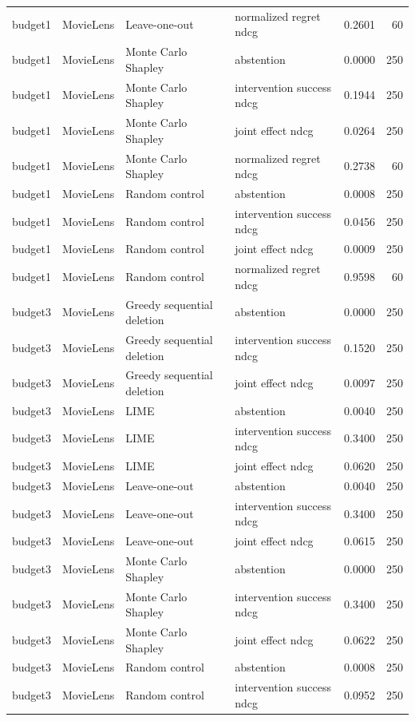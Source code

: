 \begin{longtable}{@{}p{}p{}p{}p{}rr@{}}
budget1 & MovieLens & Leave-one-out & normalized regret ndcg & 0.2601 & 60 \\
budget1 & MovieLens & Monte Carlo Shapley & abstention & 0.0000 & 250 \\
budget1 & MovieLens & Monte Carlo Shapley & intervention success ndcg & 0.1944 & 250 \\
budget1 & MovieLens & Monte Carlo Shapley & joint effect ndcg & 0.0264 & 250 \\
budget1 & MovieLens & Monte Carlo Shapley & normalized regret ndcg & 0.2738 & 60 \\
budget1 & MovieLens & Random control & abstention & 0.0008 & 250 \\
budget1 & MovieLens & Random control & intervention success ndcg & 0.0456 & 250 \\
budget1 & MovieLens & Random control & joint effect ndcg & 0.0009 & 250 \\
budget1 & MovieLens & Random control & normalized regret ndcg & 0.9598 & 60 \\
budget3 & MovieLens & Greedy sequential deletion & abstention & 0.0000 & 250 \\
budget3 & MovieLens & Greedy sequential deletion & intervention success ndcg & 0.1520 & 250 \\
budget3 & MovieLens & Greedy sequential deletion & joint effect ndcg & 0.0097 & 250 \\
budget3 & MovieLens & LIME & abstention & 0.0040 & 250 \\
budget3 & MovieLens & LIME & intervention success ndcg & 0.3400 & 250 \\
budget3 & MovieLens & LIME & joint effect ndcg & 0.0620 & 250 \\
budget3 & MovieLens & Leave-one-out & abstention & 0.0040 & 250 \\
budget3 & MovieLens & Leave-one-out & intervention success ndcg & 0.3400 & 250 \\
budget3 & MovieLens & Leave-one-out & joint effect ndcg & 0.0615 & 250 \\
budget3 & MovieLens & Monte Carlo Shapley & abstention & 0.0000 & 250 \\
budget3 & MovieLens & Monte Carlo Shapley & intervention success ndcg & 0.3400 & 250 \\
budget3 & MovieLens & Monte Carlo Shapley & joint effect ndcg & 0.0622 & 250 \\
budget3 & MovieLens & Random control & abstention & 0.0008 & 250 \\
budget3 & MovieLens & Random control & intervention success ndcg & 0.0952 & 250 \\

\end{longtable}
